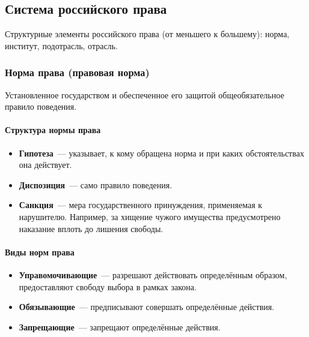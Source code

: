 \documentclass[12pt]{article}
\begin{document}
	\subsection{Система российского права}
	
	\begin{note}
		Структурные элементы российского права (от меньшего к большему): норма, институт, подотрасль, отрасль.
	\end{note}
	
	\subsubsection{Норма права (правовая норма)}
	
	\begin{definition}
		Установленное государством и обеспеченное его защитой общеобязательное правило поведения.
	\end{definition}
	
	\paragraph{Структура нормы права}
	
	\begin{itemize}
		\item \textbf{Гипотеза}~--- указывает, к кому обращена норма и при каких обстоятельствах она действует.
		\item \textbf{Диспозиция}~--- само правило поведения.
		\item \textbf{Санкция}~--- мера государственного принуждения, применяемая к нарушителю. Например, за хищение чужого имущества предусмотрено наказание вплоть до лишения свободы.
	\end{itemize}
	
	\paragraph{Виды норм права}
	
	\begin{itemize}
		\item \textbf{Управомочивающие}~--- разрешают действовать определённым образом, предоставляют свободу выбора в рамках закона.
		\item \textbf{Обязывающие}~--- предписывают совершать определённые действия.
		\item \textbf{Запрещающие}~--- запрещают определённые действия.
	\end{itemize}
	
\end{document}
